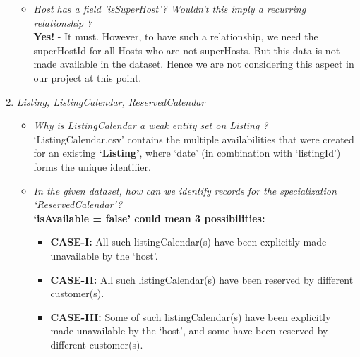 \documentclass[conference]{IEEEtran}
\begin{document}
\begin{enumerate}
\begin{itemize}
		\vspace{1mm}

		\item \textit{Host has a field 'isSuperHost'? Wouldn't this imply a recurring relationship ?}\\
                    \textbf{\color{red}Yes!} - It must. However, to have such a relationship, we need the superHostId for all Hosts who are not superHosts. But this data is not made available in the dataset. Hence we are not considering this aspect in our project at this point.

            \end{itemize}

        \vspace{1mm}
        
        \item \textit{Listing, ListingCalendar, ReservedCalendar}
            \begin{itemize}
                \item \textit{Why is ListingCalendar a weak entity set on Listing ?}\\
                {\small ‘ListingCalendar.csv’\cite{1_Airbnb} contains the multiple availabilities that were created for an existing \textbf{‘Listing’}, where ‘date’ (in combination with ‘listingId’) forms the unique identifier.}
                \vspace{1mm}
                \item \textit{In the given dataset, how can we identify records for the specialization ‘ReservedCalendar’?}\\
                   \textbf{ ‘isAvailable = false’ could mean 3 possibilities:}
                    \begin{itemize}
                        \item \textbf{CASE-I:} All such listingCalendar(s) have been explicitly made unavailable by the ‘host’.
                        \item \textbf{CASE-II:} All such listingCalendar(s) have been reserved by different customer(s).
                        \item \textbf{CASE-III:} Some of such listingCalendar(s) have been explicitly made unavailable by the ‘host’, and some have been reserved by different customer(s).
                    \end{itemize}
    
                    \vspace{1mm}
                    

\end{itemize}
\end{enumerate}
\end{document}
